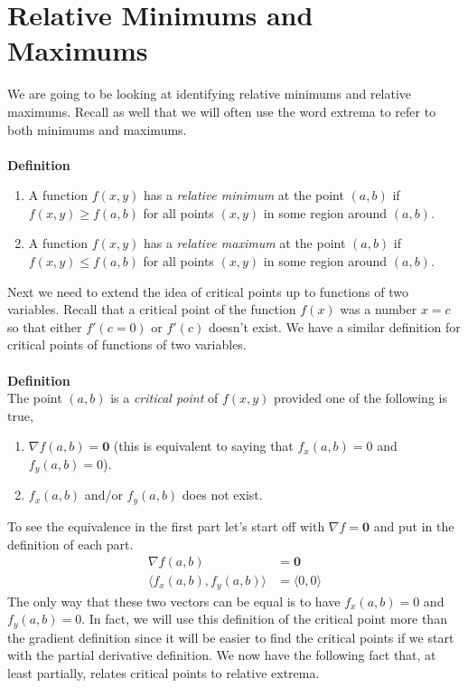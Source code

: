 \documentclass[10pt,reqno]{book}
\theoremstyle{definition}
\renewcommand{\vec}[1]{\mathbf{#1}}
\begin{document}
	\section{Relative Minimums and Maximums}
	
	We are going to be looking at identifying relative minimums and relative maximums. Recall as well that we will often use the word extrema to refer to both minimums and maximums.\\ \\
	\textbf{Definition}
	\begin{enumerate}
		\item A function $ f(x,y) $ has a \textit{relative minimum} at the point $ (a,b	) $ if $ f(x,y) \geq f(a,b) $ for all points $ (x,y) $ in some region around $ (a,b)$.
		\item A function $ f(x,y) $ has a \textit{relative maximum} at the point $ (a,b	) $ if $ f(x,y) \leq f(a,b) $ for all points $ (x,y) $ in some region around $ (a,b)$.
	\end{enumerate}
	Next we need to extend the idea of critical points up to functions of two variables. Recall that a critical point of the function $ f(x) $ was a number $ x = c $ so that either $ f'(c = 0) $ or $ f'(c) $ doesn't exist. We have a similar definition for critical points of functions of two variables.\\ \\
	\textbf{Definition}\\
	The point $ (a,b) $ is a \textit{critical point} of $ f(x,y) $ provided one of the following is true,
	\begin{enumerate}
		\item $ \nabla f(a,b) = \vec{0} $ (this is equivalent to saying that $ f_x(a,b) = 0 $ and $ f_y(a,b) = 0 $).
		\item $ f_x(a,b) $ and/or $ f_y(a,b) $ does not exist.
	\end{enumerate}
	To see the equivalence in the first part let's start off with $ \nabla f = \vec{0} $ and put in the definition of each part.
	\begin{align*}
		\nabla f(a,b) &= \vec{0}\\
		\langle f_x(a,b), f_y(a,b) \rangle &= \langle 0,0 \rangle
	\end{align*}
	The only way that these two vectors can be equal is to have $ f_x(a,b) = 0 $ and $ f_y(a,b) = 0 $. In fact, we will use this definition of the critical point more than the gradient definition since it will be easier to find the critical points if we start with the partial derivative definition. We now have the following fact that, at least partially, relates critical points to relative extrema.\\ \\
\end{document}
